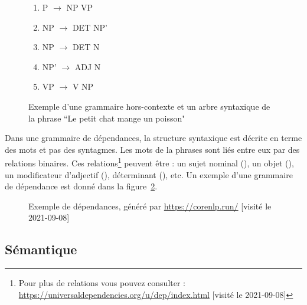 \documentclass{KodeBook}
\begin{document}
\begin{figure}[ht]
	\centering
	\begin{minipage}{0.3\textwidth}
		\begin{enumerate}
			\item P $ \rightarrow $ NP VP
			\item NP $ \rightarrow $ DET NP'
			\item NP $ \rightarrow $ DET N
			\item NP' $ \rightarrow $ ADJ N
			\item VP $ \rightarrow $ V NP
		\end{enumerate}
	\end{minipage}
	\begin{minipage}{0.3\textwidth}
	\end{minipage}

	\caption[Exemple d'une grammaire hors-contexte et un arbre syntaxique]{Exemple d'une grammaire hors-contexte et un arbre syntaxique de la phrase ``Le petit chat mange un poisson"}
	\label{fig.exp-gram-const}

\end{figure}

Dans une grammaire de dépendances, la structure syntaxique est décrite en terme des mots et pas des syntagmes.
Les mots de la phrases sont liés entre eux par des relations binaires. 
Ces relations\footnote{Pour plus de relations vous pouvez consulter : \url{https://universaldependencies.org/u/dep/index.html} [visité le 2021-09-08]} peuvent être : un sujet nominal (), un objet (), un modificateur d'adjectif (), déterminant (), etc.
Un exemple d'une grammaire de dépendance est donné dans la figure~\ref{fig:exp-gram-dep}.

\begin{figure}[ht]
	\centering
	\caption[Exemple de dépendances]{Exemple de dépendances, généré par \url{https://corenlp.run/} [visité le 2021-09-08] \label{fig:exp-gram-dep}}
\end{figure}

\subsection{Sémantique}
\end{document}
